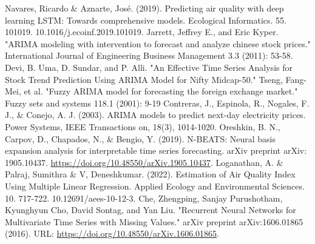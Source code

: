 \documentclass[conference]{IEEEtran}
\begin{document}
\begin{thebibliography}{00}
     Navares, Ricardo \& Aznarte, José. (2019). Predicting air quality with deep learning LSTM: Towards comprehensive models. Ecological Informatics. 55. 101019. 10.1016/j.ecoinf.2019.101019.
     Jarrett, Jeffrey E., and Eric Kyper. "ARIMA modeling with intervention to forecast and analyze chinese stock prices." International Journal of Engineering Business Management 3.3 (2011): 53-58.
     Devi, B. Uma, D. Sundar, and P. Alli. "An Effective Time Series Analysis for Stock Trend Prediction Using ARIMA Model for Nifty Midcap-50."
     Tseng, Fang-Mei, et al. "Fuzzy ARIMA model for forecasting the foreign exchange market." Fuzzy sets and systems 118.1 (2001): 9-19
     Contreras, J., Espinola, R., Nogales, F. J., \& Conejo, A. J. (2003). ARIMA models to predict next-day electricity prices. Power Systems, IEEE Transactions on, 18(3), 1014-1020.
     Oreshkin, B. N., Carpov, D., Chapados, N., \& Bengio, Y. (2019). N-BEATS: Neural basis expansion analysis for interpretable time series forecasting. arXiv preprint arXiv: 1905.10437. \url{https://doi.org/10.48550/arXiv.1905.10437}.
     Loganathan, A. \& Palraj, Sumithra \& V, Deneshkumar. (2022). Estimation of Air Quality Index Using Multiple Linear Regression. Applied Ecology and Environmental Sciences. 10. 717-722. 10.12691/aees-10-12-3.
    Che, Zhengping, Sanjay Purushotham, Kyunghyun Cho, David Sontag, and Yan Liu.
    "Recurrent Neural Networks for Multivariate Time Series with Missing Values."
    arXiv preprint arXiv:1606.01865 (2016).
    URL: \url{https://doi.org/10.48550/arXiv.1606.01865}.
\end{thebibliography}
\end{document}
